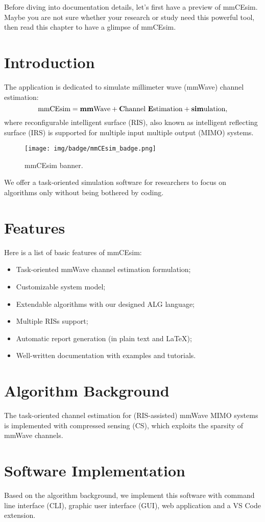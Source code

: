 Before diving into documentation details, let's first have a preview of mmCEsim.
Maybe you are not sure whether your research or study need this powerful tool,
then read this chapter to have a glimpse of mmCEsim.

\section{Introduction}

The application is dedicated to simulate
millimeter wave (mmWave) channel estimation:
\[
  \text{mmCEsim}
  =\text{\textbf{mm}Wave}
  +\text{\textbf{C}hannel \textbf{E}stimation}
  +\text{\textbf{sim}ulation},
\]
where reconfigurable intelligent surface (RIS),
also known as intelligent reflecting surface (IRS) \cite{wu2019towards} is supported
for multiple input multiple output (MIMO) systems.

\begin{figure}[htbp]
  \texttt{[image: img/badge/mmCEsim\_badge.png]}
  \caption{mmCEsim banner.}
\end{figure}

We offer a task-oriented simulation software for researchers to focus on algorithms only
without being bothered by coding.

\section{Features}

Here is a list of basic features of mmCEsim:
\begin{itemize}
  \item Task-oriented mmWave channel estimation formulation;
  \item Customizable system model;
  \item Extendable algorithms with our designed ALG language;
  \item Multiple RISs support;
  \item Automatic report generation (in plain text and \LaTeX{});
  \item Well-written documentation with examples and tutorials.
\end{itemize}

\section{Algorithm Background}

The task-oriented channel estimation for (RIS-assisted) mmWave MIMO systems
is implemented with compressed sensing (CS),
which exploits the sparsity of mmWave channels.

\section{Software Implementation}
Based on the algorithm background,
we implement this software with
command line interface (CLI),
graphic user interface (GUI),
web application and a VS Code extension.
